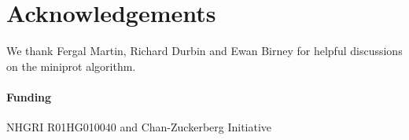 \documentclass{bioinfo}
\begin{document}
\section*{Acknowledgements}

We thank Fergal Martin, Richard Durbin and Ewan Birney for helpful discussions
on the miniprot algorithm.

\paragraph{Funding\textcolon} NHGRI R01HG010040 and Chan-Zuckerberg Initiative


\end{document}

